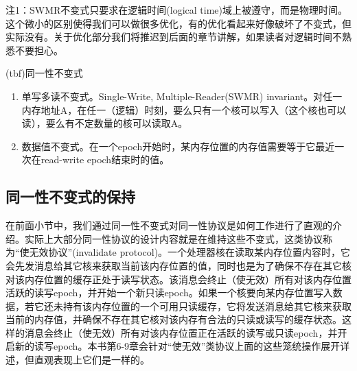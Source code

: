 \documentclass[UTF-8]{ctexrep}
\begin{document}
\par 注1：SWMR不变式只要求在逻辑时间(logical time)域上被遵守，而是物理时间。这个微小的区别使得我们可以做很多优化，有的优化看起来好像破坏了不变式，但实际没有。关于优化部分我们将推迟到后面的章节讲解，如果读者对逻辑时间不熟悉不要担心。
\par (tbf)同一性不变式
\begin{enumerate}
\item 单写多读不变式。Single-Write, Multiple-Reader(SWMR) invariant。对任一内存地址A，在任一（逻辑）时刻，要么只有一个核可以写入（这个核也可以读），要么有不定数量的核可以读取A。
\item 数据值不变式。在一个epoch开始时，某内存位置的内存值需要等于它最近一次在read-write epoch结束时的值。
\end{enumerate}
\subsection{同一性不变式的保持}
在前面小节中，我们通过同一性不变式对同一性协议是如何工作进行了直观的介绍。实际上大部分同一性协议的设计内容就是在维持这些不变式，这类协议称为“使无效协议”(invalidate protocol)。一个处理器核在读取某内存位置内容时，它会先发消息给其它核来获取当前该内存位置的值，同时也是为了确保不存在其它核对该内存位置的缓存正处于读写状态。该消息会终止（使无效）所有对该内存位置活跃的读写epoch，并开始一个新只读epoch。如果一个核要向某内存位置写入数据，若它还未持有该内存位置的一个可用只读缓存，它将发送消息给其它核来获取当前的内存值，并确保不存在其它核对该内存有合法的只读或读写的缓存状态。这样的消息会终止（使无效）所有对该内存位置正在活跃的读写或只读epoch，并开启新的读写epoch。本书第6-9章会针对“使无效”类协议上面的这些笼统操作展开详述，但直观表现上它们是一样的。
\end{document}

